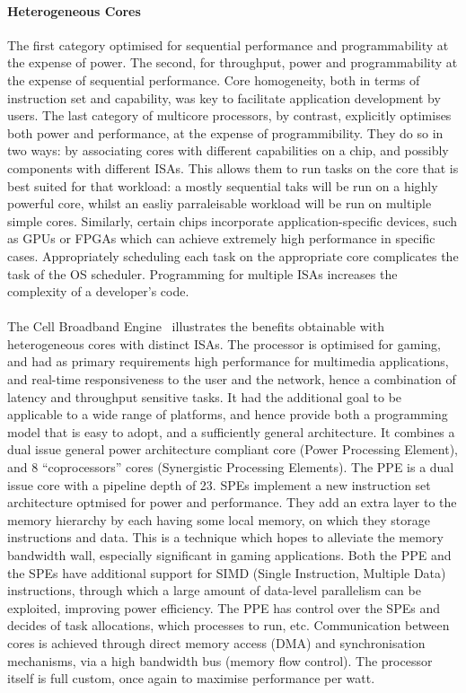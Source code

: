 \paragraph{Heterogeneous Cores} The first category optimised for 
sequential performance and programmability at the expense of power. The second, 
for throughput, power and programmability at the expense of sequential performance. 
Core homogeneity, both in terms of instruction set and capability,
was key to facilitate application development by users. The last category
of multicore processors, by contrast, explicitly optimises both
power and performance, at the expense of programmibility. They do so in two ways: 
by associating cores with different capabilities on a chip, and possibly components
with different ISAs. This allows them to run tasks on the core
that is best suited for that workload: a mostly sequential taks will be run 
on a highly powerful core, whilst an easliy parraleisable workload
will be run on multiple simple cores. Similarly, certain chips incorporate
application-specific devices, such as GPUs or FPGAs which can achieve extremely
high performance in specific cases. Appropriately scheduling each 
task on the appropriate core complicates the task of the OS scheduler.
Programming for multiple ISAs increases the complexity of a developer's code. 

\paragraph{} The Cell Broadband Engine~\cite{kahle2005cell} illustrates the benefits obtainable with heterogeneous
cores with distinct ISAs. The processor is optimised for gaming, and had as primary 
requirements high performance for multimedia applications, and real-time
responsiveness to the user and the network, hence a combination of 
latency and throughput sensitive tasks. It had the additional goal 
to be applicable to a wide range of platforms, and hence provide 
both a programming model that is easy to adopt, and a sufficiently
general architecture. It combines a dual issue general power architecture 
compliant core (Power Processing Element), and 8 ``coprocessors''
cores (Synergistic Processing Elements).  The PPE is a dual issue core with a 
pipeline depth of 23. SPEs implement a new instruction set
architecture optmised for power and performance. They add an extra layer
to the memory hierarchy by each having some local memory, on which they storage instructions and data.  This is a technique
which hopes to alleviate the memory bandwidth wall, especially significant in
gaming applications. Both the PPE and the SPEs have
additional support for SIMD (Single Instruction, Multiple Data) instructions, through
which a large amount of data-level parallelism can be exploited, improving
power efficiency. The PPE has control over the SPEs and decides of task allocations,
 which processes to run, etc. Communication between cores is achieved 
through direct memory access (DMA) and synchronisation
mechanisms, via a high bandwidth bus (memory flow control). The processor itself is full 
custom, once again to maximise performance per watt. 

